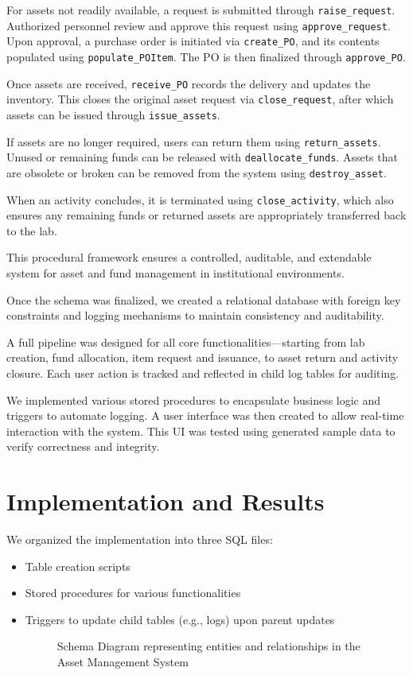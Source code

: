 \documentclass[11pt]{article}
\begin{document}
For assets not readily available, a request is submitted through \texttt{raise\_request}. Authorized personnel review and approve this request using \texttt{approve\_request}. Upon approval, a purchase order is initiated via \texttt{create\_PO}, and its contents populated using \texttt{populate\_POItem}. The PO is then finalized through \texttt{approve\_PO}.

Once assets are received, \texttt{receive\_PO} records the delivery and updates the inventory. This closes the original asset request via \texttt{close\_request}, after which assets can be issued through \texttt{issue\_assets}.

If assets are no longer required, users can return them using \texttt{return\_assets}. Unused or remaining funds can be released with \texttt{deallocate\_funds}. Assets that are obsolete or broken can be removed from the system using \texttt{destroy\_asset}.

When an activity concludes, it is terminated using \texttt{close\_activity}, which also ensures any remaining funds or returned assets are appropriately transferred back to the lab.

This procedural framework ensures a controlled, auditable, and extendable system for asset and fund management in institutional environments.

Once the schema was finalized, we created a relational database with foreign key constraints and logging mechanisms to maintain consistency and auditability.

A full pipeline was designed for all core functionalities—starting from lab creation, fund allocation, item request and issuance, to asset return and activity closure. Each user action is tracked and reflected in child log tables for auditing.

We implemented various stored procedures to encapsulate business logic and triggers to automate logging. A user interface was then created to allow real-time interaction with the system. This UI was tested using generated sample data to verify correctness and integrity.

\section{Implementation and Results}
We organized the implementation into three SQL files:
\begin{itemize}
  \item Table creation scripts
  \item Stored procedures for various functionalities
  \item Triggers to update child tables (e.g., logs) upon parent updates


\begin{sidewaysfigure}[p]
  \centering
  
  \caption{Schema Diagram representing entities and relationships in the Asset Management System}
  \label{fig:eer_diagram}
\end{sidewaysfigure}
\end{itemize}
\end{document}
